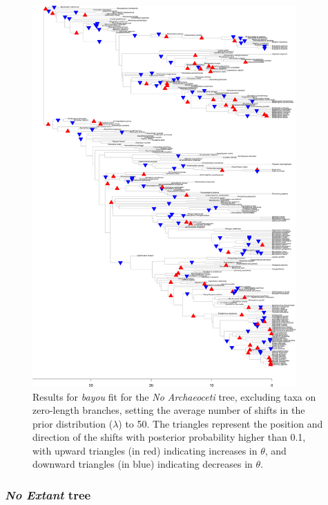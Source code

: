\begin{figure}[H]
\includegraphics[width=0.9\textwidth]{img/plots-noarchaeo-k50-1.pdf}
\caption{Results for \textit{bayou} fit for the \textit{No Archaeoceti} tree, excluding taxa on zero-length branches, setting the average number of shifts in the prior distribution ($\lambda$) to 50. The triangles represent the position and direction of the shifts with posterior probability higher than 0.1, with upward triangles (in red) indicating increases in $\theta$, and downward triangles (in blue) indicating decreases in $\theta$.}
\label{fig:noarchaeo-k50-nzlb}
\end{figure}

\subsubsection{\textit{No Extant} tree}

